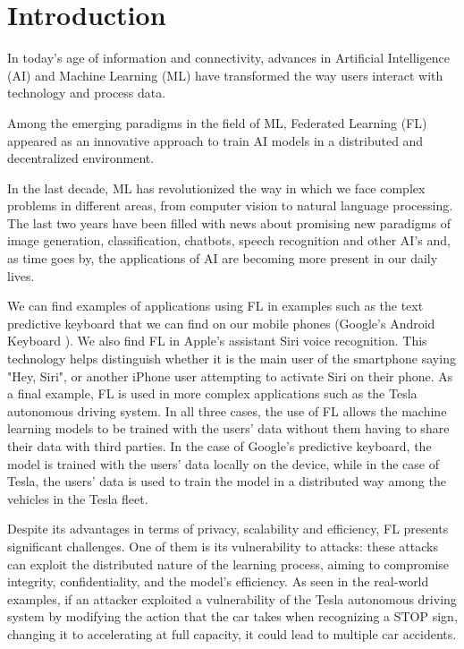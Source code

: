 \section{Introduction}
In today's age of information and connectivity, advances in Artificial Intelligence (AI) and Machine Learning (ML) have transformed the way users interact with technology and process data.

Among the emerging paradigms in the field of ML, Federated Learning (FL) appeared as an innovative approach to train AI models in a distributed and decentralized environment.

In the last decade, ML has revolutionized the way in which we face complex problems in different areas, from computer vision to natural language processing. The last two years have been filled with news about promising new paradigms of image generation, classification, chatbots, speech recognition and other AI's and, as time goes by, the applications of AI are becoming more present in our daily lives.

We can find examples of applications using FL in examples such as the text predictive keyboard that we can find on our mobile phones (Google's Android Keyboard \cite{GoogleKeyboard}). We also find FL in Apple's assistant Siri voice recognition. This technology  helps distinguish whether it is the main user of the smartphone saying "Hey, Siri", or another iPhone user attempting to activate Siri on their phone. As a final example, FL is used in more complex applications such as the Tesla autonomous driving system. In all three cases, the use of FL allows the machine learning models to be trained with the users' data without them having to share their data with third parties. In the case of Google's predictive keyboard, the model is trained with the users' data locally on the device, while in the case of Tesla, the users' data is used to train the model in a distributed way among the vehicles in the Tesla fleet.

Despite its advantages in terms of privacy, scalability and efficiency, FL presents significant challenges. One of them is its vulnerability to attacks: these attacks can exploit the distributed nature of the learning process, aiming to compromise integrity, confidentiality, and the model's efficiency. As seen in the real-world examples, if an attacker exploited a vulnerability of the Tesla autonomous driving system by modifying the action that the car takes when recognizing a STOP sign, changing it to accelerating at full capacity, it could lead to multiple car accidents.

